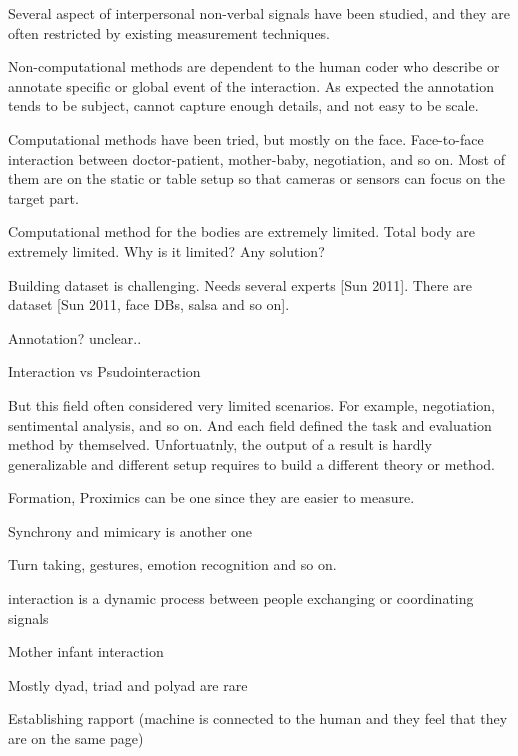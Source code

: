 Several aspect of interpersonal non-verbal signals have been studied, and they are often restricted by existing measurement techniques. 


Non-computational methods are dependent to the human coder who describe or annotate specific or global event of the interaction. As expected the annotation tends to be subject, cannot capture enough details, and not easy to be scale. 


Computational methods have been tried, but mostly on the face. Face-to-face interaction between doctor-patient, mother-baby, negotiation, and so on. Most of them are on the static or table setup so that cameras or sensors can focus on the target part. 




Computational method for the bodies are extremely limited. Total body are extremely limited. Why is it limited? Any solution?



Building dataset is challenging. Needs several experts [Sun 2011]. 
There are dataset [Sun 2011, face DBs, salsa and so on]. 

Annotation? unclear..


Interaction vs Psudointeraction










But this field often considered very limited scenarios. For example, negotiation, sentimental analysis, and so on. And each field defined the task and evaluation method by themselved. Unfortuatnly, the output of a result is hardly generalizable and different setup requires to build a different theory or method. 




Formation, Proximics can be one since they are easier to measure. 


Synchrony and mimicary is another one



Turn taking, gestures, emotion recognition and so on. 	


interaction is a dynamic process between people exchanging or coordinating signals

Mother infant interaction

Mostly dyad, triad and polyad are rare

Establishing rapport (machine is connected to the human and they feel that they are on the same page)






